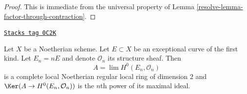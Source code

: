 \begin{proof}

This is immediate from the universal property of
Lemma \ref{resolve-lemma-factor-through-contraction}.
\end{proof}

\begin{lemma}
\label{resolve-lemma-exceptional-first-kind-local}
\href{https://stacks.math.columbia.edu/tag/0C2K}{\texttt{Stacks tag 0C2K}}

Let $X$ be a Noetherian scheme. Let $E \subset X$ be an
exceptional curve of the first kind. Let $E_n = nE$ and
denote $\mathcal{O}_n$ its structure sheaf. Then
$$
A = \lim H^0(E_n, \mathcal{O}_n)
$$
is a complete local Noetherian regular local ring of dimension $2$
and $\Ker(A \to H^0(E_n, \mathcal{O}_n))$ is the $n$th power of
its maximal ideal.
\end{lemma}

